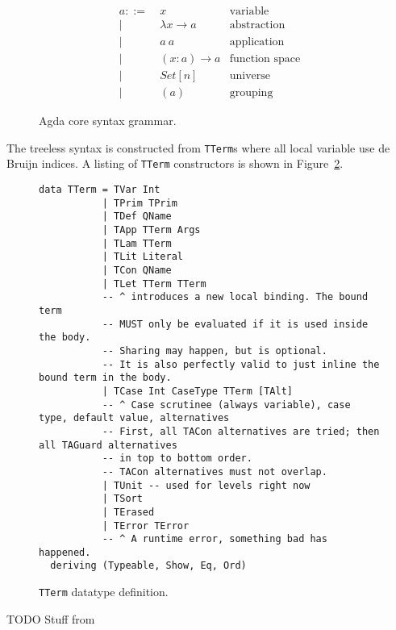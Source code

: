 \begin{figure}
\begin{align*}
a ::=~& x               & \text{variable}\\
    |~& \lambda x \to a & \text{abstraction}\\
    |~& a~a             & \text{application}\\
    |~& (x : a) \to a   & \text{function space}\\
    |~& Set[n]          & \text{universe}\\
    |~& (a)             & \text{grouping}
\end{align*}
\caption{Agda core syntax grammar.\cite{agdawiki}}
\label{fig:grammar}
\end{figure}


The treeless syntax is constructed from \lstinline{TTerm}s %
where all local variable use de Bruijn indices. A listing of \lstinline{TTerm} constructors is shown in Figure~\ref{code:TTerm}.

\begin{figure}
\begin{lstlisting}[style=blockhaskell]
data TTerm = TVar Int
           | TPrim TPrim
           | TDef QName
           | TApp TTerm Args
           | TLam TTerm
           | TLit Literal
           | TCon QName
           | TLet TTerm TTerm
           -- ^ introduces a new local binding. The bound term
           -- MUST only be evaluated if it is used inside the body.
           -- Sharing may happen, but is optional.
           -- It is also perfectly valid to just inline the bound term in the body.
           | TCase Int CaseType TTerm [TAlt]
           -- ^ Case scrutinee (always variable), case type, default value, alternatives
           -- First, all TACon alternatives are tried; then all TAGuard alternatives
           -- in top to bottom order.
           -- TACon alternatives must not overlap.
           | TUnit -- used for levels right now
           | TSort
           | TErased
           | TError TError
           -- ^ A runtime error, something bad has happened.
  deriving (Typeable, Show, Eq, Ord)
\end{lstlisting}
\caption{\lstinline{TTerm} datatype definition.}
\label{code:TTerm}
\end{figure}

TODO Stuff from \cite{abadi1991}

